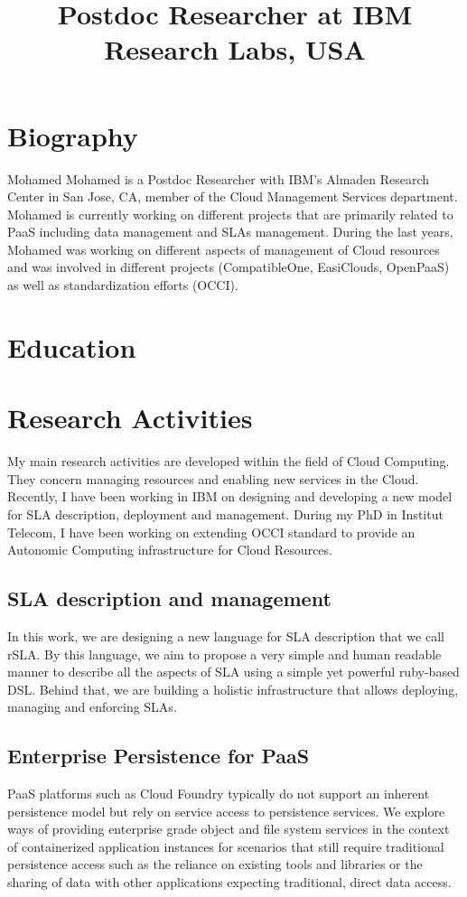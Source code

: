 \documentclass[11pt,a4paper,sans]{moderncv}   %
\title{Postdoc Researcher at IBM Research Labs, USA}               %
\begin{document}
\makecvtitle
\section{Biography} 
Mohamed Mohamed is a Postdoc Researcher with IBM's Almaden Research Center in San Jose, CA, member of the Cloud Management Services department. 
Mohamed is currently working on different projects that are primarily related to PaaS including data management and SLAs management. During 
the last years, Mohamed was working on different aspects of management of Cloud resources and was involved in different projects (CompatibleOne, 
EasiClouds, OpenPaaS) as well as standardization efforts (OCCI).

\section{Education}
\section{Research Activities}
My main research activities are developed within the field of Cloud Computing. They concern managing resources and enabling new services in the 
Cloud. Recently, I have been working in IBM on designing and developing a new model for SLA description, deployment and management. During my PhD in Institut Telecom, I have been 
working on extending OCCI standard to provide an Autonomic 
Computing infrastructure for Cloud Resources. 
\subsection{SLA description and management}
In this work, we are designing a new language for SLA description that we call rSLA. By this language, we aim to propose a very simple and human 
readable manner to describe all the aspects of SLA using a simple yet powerful ruby-based DSL. Behind that, we are building a holistic infrastructure 
that allows deploying, managing and enforcing SLAs.
\subsection{Enterprise Persistence for PaaS}
PaaS platforms such as Cloud Foundry typically do not support an inherent persistence model but rely on service access to persistence services. We explore ways of providing enterprise grade object and file system services in the context of containerized application instances for scenarios that still require traditional persistence access such as the reliance on existing tools and libraries or the sharing of data with other applications expecting traditional, direct data access.
\end{document}
